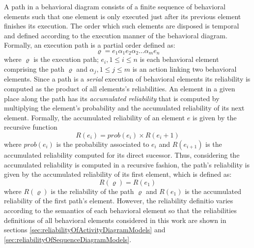 A path in a behavioral diagram consists of a finite sequence of behavioral
elements such that one element is only executed just after its previous element
finishes its execution. The order which such elements are disposed is temporal
and defined according to the execution manner of the behavioral diagram.
Formally, an execution  path is a partial order defined as: \begin{equation}
	\label{eq:pathDefinition} \varrho = e_1 \alpha_1 e_2 \alpha_2 \ldots
	\alpha_m e_n \end{equation} where $\varrho$ is the execution path;
$e_i, 1 \leq i \leq n$ is each behavioral element comprising the path $\varrho$
and $\alpha_j, 1 \leq j \leq m$ is an action linking two behavioral elements.
Since a path is a \emph{serial} execution of behavioral elements its
reliability is computed as the product of all  elements's reliabilities. An
element in a given place along the path has its \emph{accumulated reliability}
that is computed by multiplying the element's probability and the accumulated
reliability of its next element. Formally, the accumulated reliability of an
element $e$ is given by the recursive function \begin{equation}
	R(e_i)=prob(e_i) \times R(e_i+1)
	\label{eq:accumulatedReliability}\end{equation} where $prob(e_i)$ is
the probability associated to $e_i$ and $R(e_{i+1})$ is the accumulated
reliability computed for its direct sucessor. Thus, considering the accumulated
reliability is computed in a recursive fashion, the path's reliability is given
by the accumulated reliability of its first element, which is defined as:
\begin{equation} \label{eq:pathReliabilityDefinition} R(\varrho) =
	R(e_1)\end{equation} where $R(\varrho)$ is the reliability of the path
$\varrho$ and $R(e_1)$ is the accumulated reliability of the first path's
element. However, the reliability definitio varies according to the semantics
of each behavioral element so that the reliabilities definitions of all
behavioral elements considered in this work are shown in sections
\ref{sec:reliabilityOfActivityDiagramModels} and
\ref{sec:reliabilityOfSequenceDiagramModels}.

